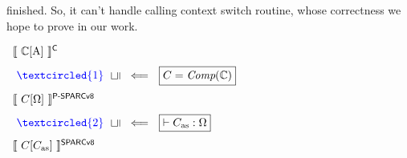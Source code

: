 finished. So, it can't handle calling context switch 
routine, whose correctness we hope to prove in our work. 
\begin{center}
    $
        \begin{array}{l}
            \semantics{\Clang[\AbsPrimC]}^{\textsf{C}}
            \\
            \\[-5pt]
            \ 
            {\color{blue} \textcircled{1}} \ \ 
            \rotatebox[origin=c]{90}{$\refine$} \ \  
            \Longleftarrow \ \ 
            \boxed{C = \textit{Comp}(\Clang)}
            \\
            \\[-5pt]
            \semantics{\code[\hprimset]}^{\textsf{P-SPARCv8}}
            \\
            \\[-5pt]
            \  
            {\color{blue} \textcircled{2}} \ \ 
            \rotatebox[origin=c]{90}{$\refine$} \ \ 
            \Longleftarrow \ \ 
            \boxed{\vdash\asmimp:\hprimset}
            \\
            \\[-5pt]
            \semantics{\code[\asmimp]}^{\textsf{SPARCv8}}
        \end{array}
    $
    \label{fig:idea to establish contextual refinement}
\end{center}

